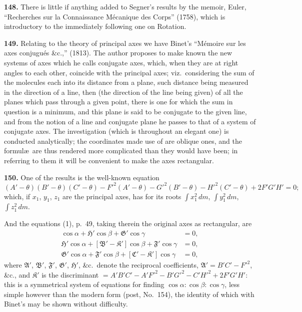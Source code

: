 \documentclass[11pt,a4paper]{article}
\theoremstyle{definition}
\begin{document}
\textbf{148.} There is little if anything added to Segner's results by the memoir, Euler, ``Recherches sur la Connaissance M\'ecanique des Corps'' (1758), which is introductory to the immediately following one on Rotation.

\textbf{149.} Relating to the theory of principal axes we have Binet's ``M\'emoire sur les axes conjugu\'es \&c.,'' (1813). The author proposes to make known the new systems of axes which he calls conjugate axes, which, when they are at right angles to each other, coincide with the principal axes; viz.\ considering the sum of the molecules each into its distance from a plane, such distance being measured in the direction of a line, then (the direction of the line being given) of all the planes which pass through a given point, there is one for which the sum in question is a minimum, and this plane is said to be conjugate to the given line, and from the notion of a line and conjugate plane he passes to that of a system of conjugate axes. The investigation (which is throughout an elegant one) is conducted analytically; the coordinates made use of are oblique ones, and the formul\ae\ are thus rendered more complicated than they would have been; in referring to them it will be convenient to make the axes rectangular.

\textbf{150.} One of the results is the well-known equation
\[
(A' - \theta)(B' - \theta)(C' - \theta) - F'^2(A' - \theta) - G'^2(B' - \theta) - H'^2(C' - \theta) + 2F'G'H' = 0;
\]
which, if $x_1$, $y_1$, $z_1$ are the principal axes, has for its roots $\int x_1^2\,dm$, $\int y_1^2\,dm$, $\int z_1^2\,dm$.

And the equations (1), p.~49, taking therein the original axes as rectangular, are
\begin{align*}
[\mathfrak{A}' - \mathfrak{K}']\cos\alpha + \mathfrak{H}'\cos\beta + \mathfrak{G}'\cos\gamma &= 0, \\
\mathfrak{H}'\cos\alpha + [\mathfrak{B}' - \mathfrak{K}']\cos\beta + \mathfrak{F}'\cos\gamma &= 0, \\
\mathfrak{G}'\cos\alpha + \mathfrak{F}'\cos\beta + [\mathfrak{C}' - \mathfrak{K}']\cos\gamma &= 0,
\end{align*}
where $\mathfrak{A}'$, $\mathfrak{B}'$, $\mathfrak{F}'$, $\mathfrak{G}'$, $\mathfrak{H}'$, \&c.\ denote the reciprocal coefficients, $\mathfrak{A}' = B'C' - F'^2$, \&c., and $\mathfrak{K}'$ is the discriminant $= A'B'C' - A'F'^2 - B'G'^2 - C'H'^2 + 2F'G'H'$: this is a symmetrical system of equations for finding $\cos\alpha : \cos\beta : \cos\gamma$, less simple however than the modern form (post, No.~154), the identity of which with Binet's may be shown without difficulty.
\end{document}
